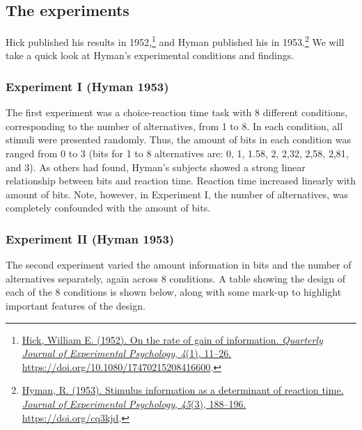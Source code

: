 \documentclass[
  oneside,
  12pt]{crumpbook}
\begin{document}
\hypertarget{the-experiments}{%
\subsection{The experiments}\label{the-experiments}}

Hick published his results in 1952,\footnote{\protect\hyperlink{ref-hickRateGainInformation1952}{Hick, William E. (1952). On the rate of gain of information. \emph{Quarterly Journal of Experimental Psychology}, \emph{4}(1), 11--26. \url{https://doi.org/10.1080/17470215208416600}}.} and Hyman published his in 1953.\footnote{\protect\hyperlink{ref-hymanStimulusInformationDeterminant1953}{Hyman, R. (1953). Stimulus information as a determinant of reaction time. \emph{Journal of Experimental Psychology}, \emph{45}(3), 188--196. \url{https://doi.org/cq3kjd}}.} We will take a quick look at Hyman's experimental conditions and findings.

\hypertarget{experiment-i-hyman-1953}{%
\subsubsection{Experiment I (Hyman 1953)}\label{experiment-i-hyman-1953}}

The first experiment was a choice-reaction time task with 8 different conditions, corresponding to the number of alternatives, from 1 to 8. In each condition, all stimuli were presented randomly. Thus, the amount of bits in each condition was ranged from 0 to 3 (bits for 1 to 8 alternatives are: 0, 1, 1.58, 2, 2,32, 2,58, 2,81, and 3). As others had found, Hyman's subjects showed a strong linear relationship between bits and reaction time. Reaction time increased linearly with amount of bits. Note, however, in Experiment I, the number of alternatives, was completely confounded with the amount of bits.

\hypertarget{experiment-ii-hyman-1953}{%
\subsubsection{Experiment II (Hyman 1953)}\label{experiment-ii-hyman-1953}}

The second experiment varied the amount information in bits and the number of alternatives separately, again across 8 conditions. A table showing the design of each of the 8 conditions is shown below, along with some mark-up to highlight important features of the design.
\end{document}
